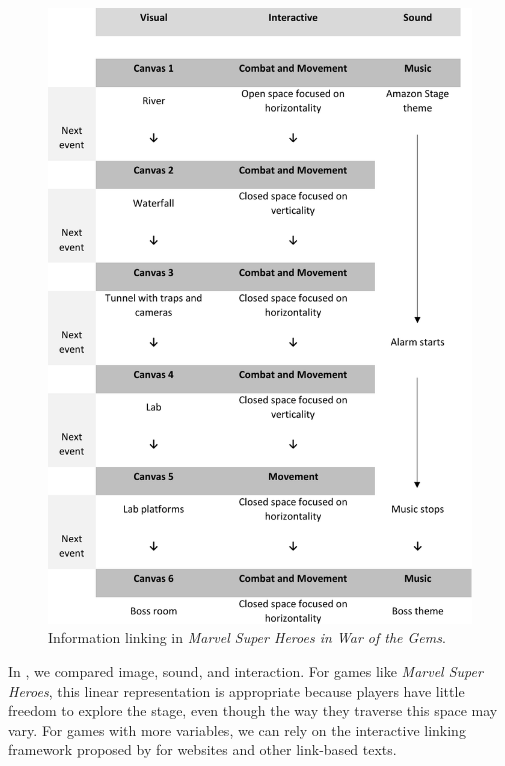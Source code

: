 \documentclass[english]{textolivre}
\begin{document}
\begin{figure}[htbp]
 \centering
 \begin{minipage}{.85\textwidth}
 \includegraphics[width=\textwidth]{fig-3.pdf}
 \caption{Information linking in \textit{Marvel Super Heroes in War of the Gems}.}
 \label{fig04}
 \end{minipage}
\end{figure}

In , we compared image, sound, and interaction. For games like \textit{Marvel Super Heroes}, this linear representation is appropriate because players have little freedom to explore the stage, even though the way they traverse this space may vary. For games with more variables, we can rely on the interactive linking framework proposed by \textcite[p. 237]{van_leeuwen_introducing_2005} for websites and other link-based texts.
\end{document}
